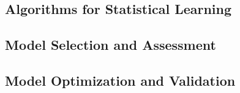 \subsection{Algorithms for Statistical Learning}
\label{sec:algs}


\subsection{Model Selection and Assessment}
\label{sec:selectass}


\subsection{Model Optimization and Validation}
\label{sec:optvalid}

